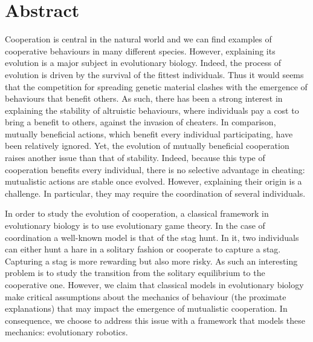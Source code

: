 \newpage
\section*{Abstract}

	Cooperation is central in the natural world and we can find examples of cooperative behaviours in many different species. However, explaining its evolution is a major subject in evolutionary biology. Indeed, the process of evolution is driven by the survival of the fittest individuals. Thus it would seems that the competition for spreading genetic material clashes with the emergence of behaviours that benefit others. As such, there has been a strong interest in explaining the stability of altruistic behaviours, where individuals pay a cost to bring a benefit to others, against the invasion of cheaters. In comparison, mutually beneficial actions, which benefit every individual participating, have been relatively ignored. Yet, the evolution of mutually beneficial cooperation raises another issue than that of stability. Indeed, because this type of cooperation benefits every individual, there is no selective advantage in cheating: mutualistic actions are stable once evolved. However, explaining their origin is a challenge. In particular, they may require the coordination of several individuals.

	In order to study the evolution of cooperation, a classical framework in evolutionary biology is to use evolutionary game theory. In the case of coordination a well-known model is that of the stag hunt. In it, two individuals can either hunt a hare in a solitary fashion or cooperate to capture a stag. Capturing a stag is more rewarding but also more risky. As such an interesting problem is to study the transition from the solitary equilibrium to the cooperative one. However, we claim that classical models in evolutionary biology make critical assumptions about the mechanics of behaviour (the proximate explanations) that may impact the emergence of mutualistic cooperation. In consequence, we choose to address this issue with a framework that models these mechanics: evolutionary robotics.


